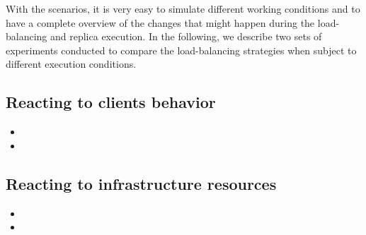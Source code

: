 With the scenarios, it is very easy to simulate different working
conditions and to have a complete overview of the changes that might
happen during the load-balancing and replica execution. In the following,
we describe two sets of experiments conducted to compare the load-balancing
strategies when subject to different execution conditions.

\subsection{Reacting to clients behavior}

\begin{itemize}
\item {}
\item {}
\end{itemize}

\subsection{Reacting to infrastructure resources}

\begin{itemize}
\item {}
\item {}
\end{itemize}

